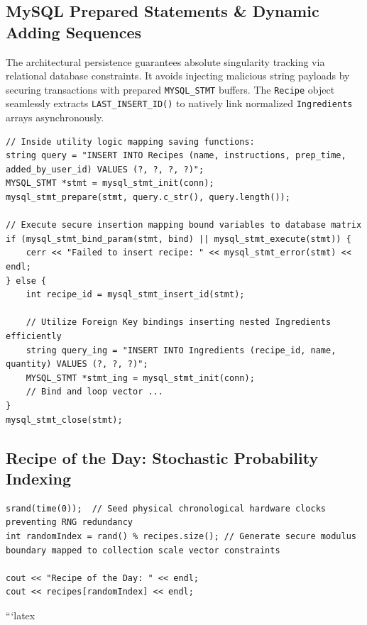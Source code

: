 \documentclass[12pt, a4paper]{article}
\begin{document}
\subsection{MySQL Prepared Statements \& Dynamic Adding Sequences}
The architectural persistence guarantees absolute singularity tracking via relational database constraints. It avoids injecting malicious string payloads by securing transactions with prepared \texttt{MYSQL\_STMT} buffers. The \texttt{Recipe} object seamlessly extracts \texttt{LAST\_INSERT\_ID()} to natively link normalized \texttt{Ingredients} arrays asynchronously.
\begin{lstlisting}[caption={MySQL Constraint Tracking and Parameterized SQL Injection}]
// Inside utility logic mapping saving functions:
string query = "INSERT INTO Recipes (name, instructions, prep_time, added_by_user_id) VALUES (?, ?, ?, ?)";
MYSQL_STMT *stmt = mysql_stmt_init(conn);
mysql_stmt_prepare(stmt, query.c_str(), query.length());

// Execute secure insertion mapping bound variables to database matrix
if (mysql_stmt_bind_param(stmt, bind) || mysql_stmt_execute(stmt)) {
    cerr << "Failed to insert recipe: " << mysql_stmt_error(stmt) << endl;
} else {
    int recipe_id = mysql_stmt_insert_id(stmt);
    
    // Utilize Foreign Key bindings inserting nested Ingredients efficiently
    string query_ing = "INSERT INTO Ingredients (recipe_id, name, quantity) VALUES (?, ?, ?)";
    MYSQL_STMT *stmt_ing = mysql_stmt_init(conn);
    // Bind and loop vector ...
}
mysql_stmt_close(stmt);
\end{lstlisting}

\subsection{Recipe of the Day: Stochastic Probability Indexing}
\begin{lstlisting}[caption={Random Access Array Seeding Logic}]
srand(time(0));  // Seed physical chronological hardware clocks preventing RNG redundancy
int randomIndex = rand() % recipes.size(); // Generate secure modulus boundary mapped to collection scale vector constraints

cout << "Recipe of the Day: " << endl;
cout << recipes[randomIndex] << endl; 
\end{lstlisting}

\newpage

```latex
\end{document}
